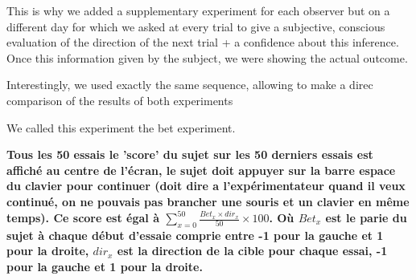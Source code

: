 \documentclass[profile,final,english, draft]{article}%
\begin{document}


This is why we added a supplementary experiment for each observer but on a different day for which we asked at every trial to give a subjective, conscious evaluation of the direction of the next trial + a confidence about this inference. Once this information given by the subject, we were showing the actual outcome.

Interestingly, we used exactly the same sequence, allowing to make a direc comparison of the results of both experiments

We called this experiment the bet experiment.


\textbf{Tous les 50 essais le 'score' du sujet sur les 50 derniers essais est affiché au centre de l'écran, le sujet doit appuyer sur la barre espace du clavier pour continuer (doit dire a l'expérimentateur quand il veux continué, on ne pouvais pas brancher une souris et un clavier en même temps). Ce score est égal à $\sum_{x=0}^{50} \frac{Bet_{x} \times dir_x}{50} \times 100$. Où $Bet_x$ est le parie du sujet à chaque début d'essaie comprie entre -1 pour la gauche et 1 pour la droite, $dir_x$ est la direction de la cible pour chaque essai, -1 pour la gauche et 1 pour la droite.}


\end{document}
